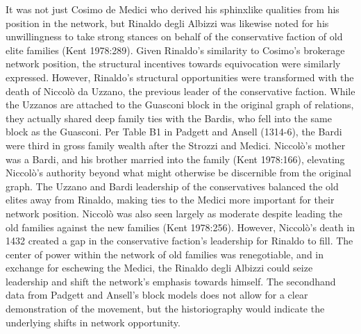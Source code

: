 \documentclass[12pt]{article}
\begin{document}
It was not just Cosimo de Medici who derived his sphinxlike qualities from his position in the network, but Rinaldo degli Albizzi was likewise noted for his unwillingness to take strong stances on behalf of the conservative faction of old elite families (Kent 1978:289). Given Rinaldo’s similarity to Cosimo’s brokerage network position, the structural incentives towards equivocation were similarly expressed. However, Rinaldo’s structural opportunities were transformed with the death of Niccolò da Uzzano, the previous leader of the conservative faction. While the Uzzanos are attached to the Guasconi block in the original graph of relations, they actually shared deep family ties with the Bardis, who fell into the same block as the Guasconi. Per Table B1 in Padgett and Ansell (1314-6), the Bardi were third in gross family wealth after the Strozzi and Medici. Niccolò’s mother was a Bardi, and his brother married into the family (Kent 1978:166), elevating Niccolò’s authority beyond what might otherwise be discernible from the original graph. The Uzzano and Bardi leadership of the conservatives balanced the old elites away from Rinaldo, making ties to the Medici more important for their network position. Niccolò was also seen largely as moderate despite leading the old families against the new families (Kent 1978:256). However, Niccolò’s death in 1432 created a gap in the conservative faction’s leadership for Rinaldo to fill. The center of power within the network of old families was renegotiable, and in exchange for eschewing the Medici, the Rinaldo degli Albizzi could seize leadership and shift the network's emphasis towards himself. The secondhand data from Padgett and Ansell’s block models does not allow for a clear demonstration of the movement, but the historiography would indicate the underlying shifts in network opportunity.      
\end{document}
